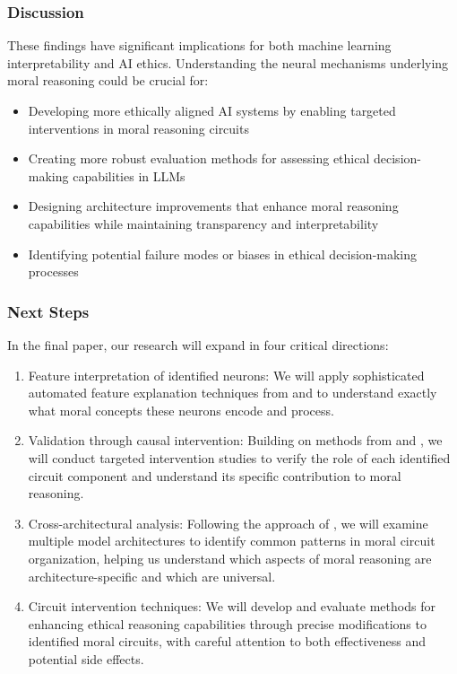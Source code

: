 \documentclass[runninghheads]{llncs}
\begin{document}
\subsubsection*{Discussion}

These findings have significant implications for both machine learning interpretability and AI ethics. Understanding the neural mechanisms underlying moral reasoning could be crucial for:

\begin{itemize}
    \item Developing more ethically aligned AI systems by enabling targeted interventions in moral reasoning circuits
    \item Creating more robust evaluation methods for assessing ethical decision-making capabilities in LLMs
    \item Designing architecture improvements that enhance moral reasoning capabilities while maintaining transparency and interpretability
    \item Identifying potential failure modes or biases in ethical decision-making processes
\end{itemize}


\subsubsection*{Next Steps} In the final paper, our research will expand in four critical directions:

 \begin{enumerate} 

\item Feature interpretation of identified neurons: We will apply sophisticated automated feature explanation techniques from \cite{bills2023language} and \cite{choi2024automatic} to understand exactly what moral concepts these neurons encode and process.

\item Validation through causal intervention: Building on methods from \cite{stolfo_mechanistic_2023} and \cite{geiger_causal_2024}, we will conduct targeted intervention studies to verify the role of each identified circuit component and understand its specific contribution to moral reasoning.

\item Cross-architectural analysis: Following the approach of \cite{ferrando_similarity_2024}, we will examine multiple model architectures to identify common patterns in moral circuit organization, helping us understand which aspects of moral reasoning are architecture-specific and which are universal.

\item Circuit intervention techniques: We will develop and evaluate methods for enhancing ethical reasoning capabilities through precise modifications to identified moral circuits, with careful attention to both effectiveness and potential side effects.

\end{enumerate}
\end{document}
